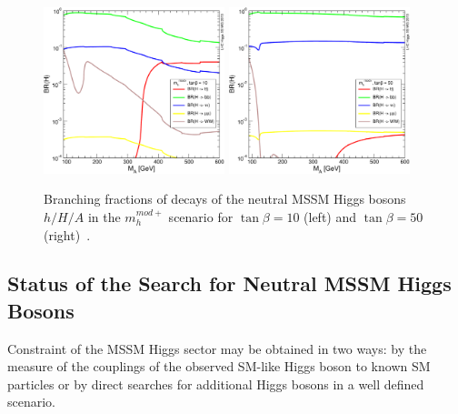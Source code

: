 \begin{figure}[tp]
\begin{center}
            \includegraphics[width=0.47\textwidth]{figure/BR_higgs/YRHXS3_BR_fig37.pdf}
            \includegraphics[width=0.47\textwidth]{figure/BR_higgs/YRHXS3_BR_fig38.pdf}

    \end{center}
    \caption{Branching fractions of decays of the neutral MSSM Higgs bosons $h/H/A$ in the  $m_h^{mod+}$ scenario for $\tan\beta=10$ (left)
	 and $\tan\beta=50$ (right)~\cite{LHCxsec}.}
   \label{fig:br}

\end{figure}



\subsection{Status of the Search for Neutral MSSM Higgs Bosons}

Constraint of the MSSM Higgs sector may be obtained in two ways: by the measure 
of the couplings of the observed SM-like Higgs boson to known SM particles or  by direct searches for additional Higgs bosons in a well 
defined scenario.

